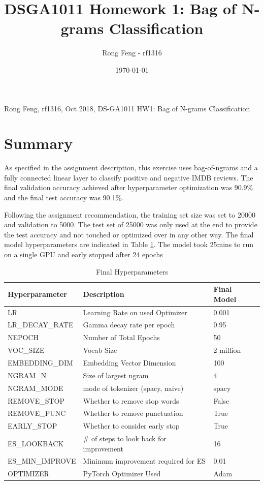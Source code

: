 \documentclass[a4paper,10pt]{article}
\title{DSGA1011 Homework 1: Bag of N-grams Classification}
\author{Rong Feng - rf1316}
\date{\printdayoff\today}
\begin{document}
Rong Feng, rf1316, Oct 2018, DS-GA1011 HW1: Bag of N-grams Classification

\section{Summary}
\par 
\justify
As specified in the assignment description, this exercise uses bag-of-ngrams and a fully connected linear layer to classify positive and negative IMDB reviews. The final validation accuracy achieved after hyperparameter optimization was 90.9\% and the final test accuracy was 90.1\%. 

\par
\justify
Following the assignment recommendation, the training set size was set to 20000 and validation to 5000. The test set of 25000 was only used at the end to provide the test accuracy and not touched or optimized over in any other way. The final model hyperparameters are indicated in Table \ref{tbl:finalhparams}. The model took 25mins to run on a single GPU and early stopped after 24 epochs

\begin{table}[!htbp]
\begin{tabular}{| l | l | l |}
\hline
Hyperparameter   & Description                                & Final Model    \\
\hline
LR               & Learning Rate on used Optimizer            & 0.001          \\
LR\_DECAY\_RATE  & Gamma decay rate per epoch                 & 0.95           \\
NEPOCH           & Number of Total Epochs                     & 50             \\
VOC\_SIZE        & Vocab Size                                 & 2 million      \\
EMBEDDING\_DIM   & Embedding Vector Dimension                 & 100            \\
NGRAM\_N         & Size of largest ngram                      & 4              \\
NGRAM\_MODE      & mode of tokenizer (spacy, naive)           & spacy          \\
REMOVE\_STOP     & Whether to remove stop words               & False          \\
REMOVE\_PUNC     & Whether to remove punctuation              & True           \\
EARLY\_STOP      & Whether to consider early stop             & True           \\
ES\_LOOKBACK     & \# of steps to look back for improvement   & 16             \\
ES\_MIN\_IMPROVE & Minimum improvement required for ES        & 0.01           \\
OPTIMIZER        & PyTorch Optimizer Used                     & Adam           \\
\hline
\end{tabular}
\caption{Final Hyperparameters}\label{tbl:finalhparams}
\end{table}
\end{document}
